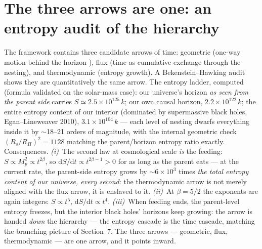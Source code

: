 \documentclass[11pt]{article}
\begin{document}
\section{The three arrows are one: an entropy audit of the hierarchy}
The framework contains three candidate arrows of time: geometric (one-way motion behind the horizon \cite{Pop2016}), flux (time as cumulative exchange through the nesting), and thermodynamic (entropy growth). A Bekenstein--Hawking audit shows they are quantitatively the same arrow. The entropy ladder, computed (formula validated on the solar-mass case): our universe's horizon \emph{as seen from the parent side} carries $S \simeq 2.5\times10^{125}\,k$; our own causal horizon, $2.2\times10^{122}\,k$; the entire entropy content of our interior (dominated by supermassive black holes, Egan--Lineweaver 2010), $3.1\times10^{104}\,k$ --- each level of nesting dwarfs everything inside it by $\sim$18--21 orders of magnitude, with the internal geometric check $(R_s/R_H)^2 = 1128$ matching the parent/horizon entropy ratio exactly. Consequences. \emph{(i)}~The second law at cosmological scale \emph{is} the feeding: $S \propto M_p^2 \propto t^{2\beta}$, so $\mathrm{d}S/\mathrm{d}t \propto t^{2\beta-1} > 0$ for as long as the parent eats --- at the current rate, the parent-side entropy grows by $\sim 6\times10^{3}$ times \emph{the total entropy content of our universe, every second}: the thermodynamic arrow is not merely aligned with the flux arrow, it is enslaved to it. \emph{(ii)}~At $\beta = 5/2$ the exponents are again integers: $S \propto t^{5}$, $\mathrm{d}S/\mathrm{d}t \propto t^{4}$. \emph{(iii)}~When feeding ends, the parent-level entropy freezes, but the interior black holes' horizons keep growing: the arrow is handed \emph{down} the hierarchy --- the entropy cascade is the time cascade, matching the branching picture of Section~7. The three arrows --- geometric, flux, thermodynamic --- are one arrow, and it points inward.
\end{document}
